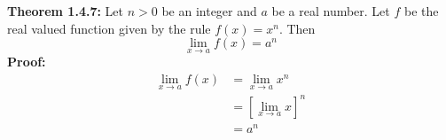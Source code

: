 \documentclass{article}
\begin{document}
	\textbf{Theorem 1.4.7:} Let $n > 0$ be an integer and $a$ be a real number. Let $f$ be the real valued function given by the rule $f(x) = x^n$. Then
	$$\lim_{x \to a}{f(x)} = a^n$$
	\textbf{Proof:}
	\begin{align*}
		\lim_{x \to a}{f(x)} &= \lim_{x \to a}{x^n} \\
		                     &= \left[\lim_{x \to a}{x}\right]^n \tag{Theorem 1.4.6} \\
		                     &= a^n \tag{Theorem 1.3.2}
	\end{align*}
\end{document}
